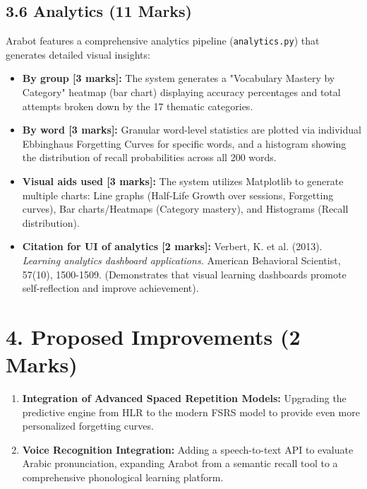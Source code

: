 \documentclass[12pt,a4paper]{article}
\begin{document}
\subsection*{3.6 Analytics (11 Marks)}
Arabot features a comprehensive analytics pipeline (\texttt{analytics.py}) that generates detailed visual insights:
\begin{itemize}[label={--}]
    \item \textbf{By group [3 marks]:} The system generates a "Vocabulary Mastery by Category" heatmap (bar chart) displaying accuracy percentages and total attempts broken down by the 17 thematic categories.
    \item \textbf{By word [3 marks]:} Granular word-level statistics are plotted via individual Ebbinghaus Forgetting Curves for specific words, and a histogram showing the distribution of recall probabilities across all 200 words.
    \item \textbf{Visual aids used [3 marks]:} The system utilizes Matplotlib to generate multiple charts: Line graphs (Half-Life Growth over sessions, Forgetting curves), Bar charts/Heatmaps (Category mastery), and Histograms (Recall distribution).
    \item \textbf{Citation for UI of analytics [2 marks]:} Verbert, K. et al. (2013). \textit{Learning analytics dashboard applications.} American Behavioral Scientist, 57(10), 1500-1509. (Demonstrates that visual learning dashboards promote self-reflection and improve achievement).
\end{itemize}

\section*{4. Proposed Improvements (2 Marks)}
\begin{enumerate}
    \item \textbf{Integration of Advanced Spaced Repetition Models:} Upgrading the predictive engine from HLR to the modern FSRS model to provide even more personalized forgetting curves.
    \item \textbf{Voice Recognition Integration:} Adding a speech-to-text API to evaluate Arabic pronunciation, expanding Arabot from a semantic recall tool to a comprehensive phonological learning platform.
\end{enumerate}
\end{document}

